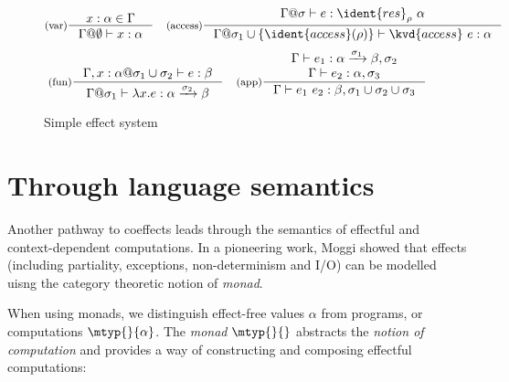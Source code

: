
\begin{figure}[t]
\begin{equation*}
\inference[(var)]
  {x:\alpha \in \Gamma }
  {\Gamma @ \emptyset \vdash x : \alpha }
\quad
\inference[(access)]
  { \Gamma @ \sigma \vdash e : \ident{res}_\rho~\alpha }
  {\Gamma @ \sigma_1 \cup \{\ident{access}(\rho)\} \vdash \kvd{access}~e : \alpha }
\end{equation*}
\begin{equation*}
\inference[(fun)]
  {\Gamma, x:\alpha @ \sigma_1 \cup \sigma_2 \vdash e : \beta }
  {\Gamma @ \sigma_1 \vdash \lambda x.e : \alpha \xrightarrow{\sigma_2} \beta}
\quad  
\inference[(app)]
  {\Gamma \vdash e_1 : \alpha \xrightarrow{\sigma_1} \beta, \sigma_2 \\
   \Gamma \vdash e_2 : \alpha, \sigma_3 }
  {\Gamma \vdash e_1~e_2 : \beta, \sigma_1 \cup \sigma_2 \cup \sigma_3 }
\end{equation*}

\caption{Simple effect system}
\label{fig:path-coeff}
\end{figure}


\section{Through language semantics}
\label{sec:path-sem}

Another pathway to coeffects leads through the semantics of effectful and context-dependent 
computations. In a pioneering work, Moggi \cite{monad-notions} showed that effects (including
partiality, exceptions, non-determinism and I/O) can be modelled uisng the category theoretic
notion of \emph{monad}.

When using monads, we distinguish effect-free values $\alpha$ from programs, or 
computations $\mtyp{}{\alpha}$. The \emph{monad} $\mtyp{}{}$ abstracts the \emph{notion of 
computation} and provides a way of constructing and composing effectful computations:

